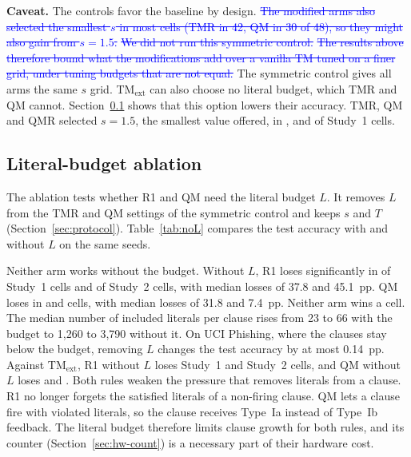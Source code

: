 \documentclass[preprint,12pt,times]{elsarticle}
\newcommand{\add}[1]{{\color{blue}#1}}
\newcommand{\del}[1]{\textcolor{blue}{\sout{#1}}}
\begin{document}
\textbf{Caveat.} The controls favor the baseline by design.
\del{The modified arms also selected the smallest $s$ in most cells (TMR in 42, QM in 30 of 48), so they might also gain from {$s = 1.5$}.}
\del{We did not run this symmetric control.}
\del{The results above therefore bound what the modifications add over a vanilla TM tuned on a finer grid, under tuning budgets that are not equal.}
\add{The symmetric control gives all arms the same $s$ grid.
TM$_{\mathrm{ext}}$ can also choose no literal budget, which TMR and QM cannot. Section~\ref{sec:res-noL} shows that this option lowers their accuracy.
TMR, QM and QMR selected $s = 1.5$, the smallest value offered, in \selFiveROneSlow{}, \selFiveQOneSlow{} and \selFiveQROneSlow{} of \selFiveROneN{} Study~1 cells.}

\add{\subsection{Literal-budget ablation}
\label{sec:res-noL}
The ablation tests whether R1 and QM need the literal budget $L$.
It removes $L$ from the TMR and QM settings of the symmetric control and keeps $s$ and $T$ (Section~\ref{sec:protocol}).
Table~\ref{tab:noL} compares the test accuracy with and without $L$ on the same seeds.}

\begin{table}[!htbp]
\centering
\add{\caption{Literal-budget ablation (test accuracy, seeds 101 to 103, Welch, Holm within each row). No budget $-$ budget: the same arm and setting without and with $L$. W/L: significant wins and losses. Med.: median difference in pp. Within 1~pp: cells with an absolute difference of at most 1~pp. Literals per clause: median over cells of the mean number of included literals per clause after training. Study~1: 48 cells. Study~2: 12 cells.}
\label{tab:noL}}
\footnotesize
\setlength{\tabcolsep}{5pt}
\add{}
\end{table}

\add{Neither arm works without the budget.
Without $L$, R1 loses significantly in \noLROneL{} of \noLROneN{} Study~1 cells and \noLRTwoL{} of \noLRTwoN{} Study~2 cells, with median losses of 37.8 and 45.1~pp.
QM loses in \noLQOneL{} and \noLQTwoL{} cells, with median losses of 31.8 and 7.4~pp.
Neither arm wins a cell.
The median number of included literals per clause rises from 23 to 66 with the budget to 1,260 to 3,790 without it.
On UCI Phishing, where the clauses stay below the budget, removing $L$ changes the test accuracy by at most 0.14~pp.
Against TM$_{\mathrm{ext}}$, R1 without $L$ loses \noLROneTmL{} Study~1 and \noLRTwoTmL{} Study~2 cells, and QM without $L$ loses \noLQOneTmL{} and \noLQTwoTmL{}.
Both rules weaken the pressure that removes literals from a clause.
R1 no longer forgets the satisfied literals of a non-firing clause.
QM lets a clause fire with violated literals, so the clause receives Type~Ia instead of Type~Ib feedback.
The literal budget therefore limits clause growth for both rules, and its counter (Section~\ref{sec:hw-count}) is a necessary part of their hardware cost.}
\end{document}
